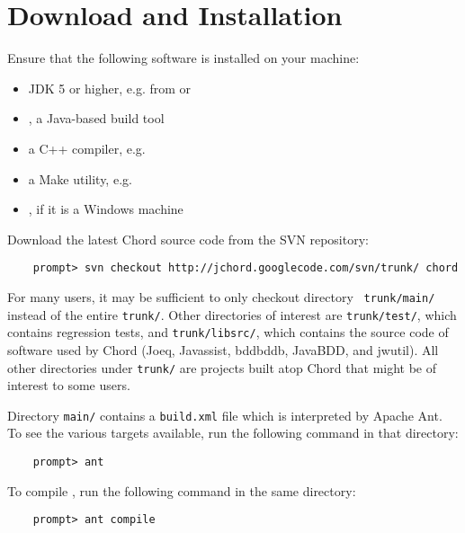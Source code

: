 \section{Download and Installation}
\label{sec:download-and-installation}

Ensure that the following software is installed on your machine:

\begin{itemize}
\item
JDK 5 or higher, e.g. from
 or
\item
{}, a Java-based build tool
\item
a C++ compiler, e.g. 
\item
a Make utility, e.g. 
\item
{}, if it is a Windows machine
\end{itemize}

Download the latest Chord source code from the SVN repository:

\begin{verbatim}
    prompt> svn checkout http://jchord.googlecode.com/svn/trunk/ chord
\end{verbatim}
For many users, it may be sufficient to only checkout directory {\tt
  trunk/main/} instead of the entire {\tt trunk/}.  Other directories
of interest are {\tt trunk/test/}, which contains regression tests,
and {\tt trunk/libsrc/}, which contains the source code of software
used by Chord (Joeq, Javassist, bddbddb, JavaBDD, and jwutil).  All
other directories under {\tt trunk/} are projects built atop Chord
that might be of interest to some users.

Directory {\tt main/} contains a {\tt build.xml} file which is
interpreted by Apache Ant.  To see the various targets available, run
the following command in that directory:

\begin{verbatim}
    prompt> ant
\end{verbatim}

\noindent To compile \Chord, run the following command in the same
directory:

\begin{verbatim}
    prompt> ant compile
\end{verbatim}

